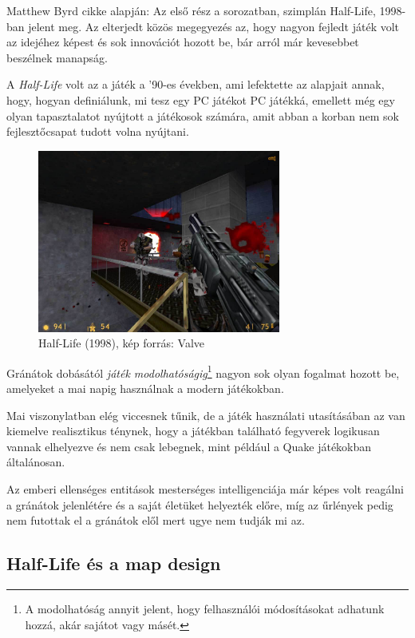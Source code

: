 \documentclass[]{thesis-ekf}
\theoremstyle{definition}
\begin{document}
	Matthew Byrd cikke\cite{HL} alapján:
	Az első rész a sorozatban, szimplán Half-Life, 1998-ban jelent meg. Az elterjedt közös megegyezés az, hogy nagyon fejledt játék volt az idejéhez képest és sok innovációt hozott be, bár arról már kevesebbet beszélnek manapság.
	
	A \emph{Half-Life} volt az a játék a '90-es években, ami lefektette az alapjait annak, hogy, hogyan definiálunk, mi tesz egy PC játékot PC játékká, emellett még egy olyan tapasztalatot nyújtott a játékosok számára, amit abban a korban nem sok fejlesztőcsapat tudott volna nyújtani.
	
	\begin{figure}[!ht]
		\label{kep:hl1}
		\centering
		\includegraphics[width=8cm]{halflife1}
		\caption{Half-Life (1998), kép forrás: Valve\cite{pic-HL}}
	\end{figure}
	
	Gránátok dobásától \emph{játék modolhatóságig}\footnote{A modolhatóság annyit jelent, hogy felhasználói módosításokat adhatunk hozzá, akár sajátot vagy másét.} nagyon sok olyan fogalmat hozott be, amelyeket a mai napig használnak a modern játékokban.
	
	Mai viszonylatban elég viccesnek tűnik, de a játék használati utasításában az van kiemelve realisztikus ténynek, hogy a játékban található fegyverek logikusan vannak elhelyezve és nem csak lebegnek, mint például a Quake játékokban általánosan.
	
	Az emberi ellenséges entitások mesterséges intelligenciája már képes volt reagálni a gránátok jelenlétére és a saját életüket helyezték előre, míg az űrlények pedig nem futottak el a gránátok elől mert ugye nem tudják mi az.
	
	\subsection{Half-Life és a map design}
	
\end{document}
